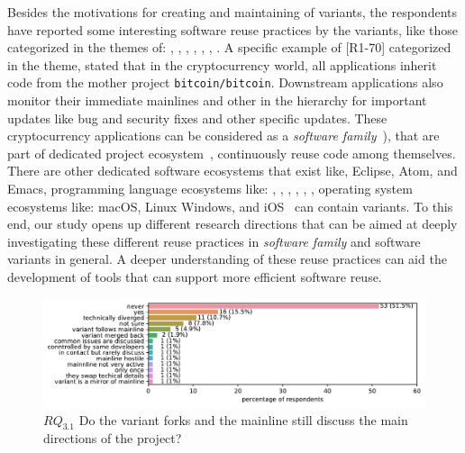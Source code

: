Besides the motivations for creating and maintaining of variants, the respondents have reported some interesting software reuse practices by the variants, like those categorized in the themes of: , , , , , , . A specific example of [R1-70] categorized in the  theme, stated that in the cryptocurrency world, all applications inherit code from the mother project \texttt{bitcoin/bitcoin}. Downstream applications also monitor their immediate mainlines and other in the hierarchy for important updates like bug and security fixes and other specific updates. These cryptocurrency applications can be considered as a \textit{software family}~\cite{businge:2018icsme,businge:emse:2021}), that are part of dedicated project ecosystem~\cite{tommens:2020}, continuously reuse code among themselves. 
There are other dedicated software ecosystems that exist like, \textsf{Eclipse}, \textsf{Atom}, and \textsf{Emacs}, programming language ecosystems like:  \java, \cp, \cpp, \py, \go, \rb, operating system ecosystems like: \textsf{macOS}, \textsf{Linux} \textsf{Windows}, and \textsf{iOS}~\cite{tommens:2020} can contain variants.
To this end, our study opens up different research directions that can be aimed at deeply investigating these different reuse practices in \textit{software family} and software variants in general. A deeper understanding of these reuse practices can aid the development of tools that can support more efficient software reuse. 


\begin{figure}[ht]
\begin{center}
    \centering
    \includegraphics[width=\columnwidth]{pdfs/discussions_rq3_colored.pdf}
    \caption{$RQ_{3.1}$ Do the variant forks and the mainline still discuss the main directions of the project?}
    \label{fig:discussions}
\end{center}
\vspace{-.3cm}
\end{figure}

